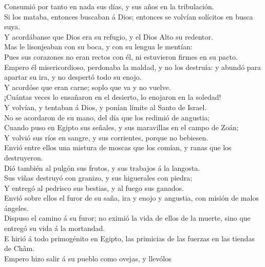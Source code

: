  Consumió por tanto en nada sus días, y sus años en la
tribulación.\\
 Si los mataba, entonces buscaban á Dios; entonces se
volvían solícitos en busca suya.\\
 Y acordábanse que Dios era su refugio, y el Dios Alto su
redentor.\\
 Mas le lisonjeaban con su boca, y con su lengua le
mentían:\\
 Pues sus corazones no eran rectos con él, ni estuvieron
firmes en su pacto.\\
 Empero él misericordioso, perdonaba la maldad, y no los
destruía: y abundó para apartar su ira, y no despertó todo su enojo.\\
 Y acordóse que eran carne; soplo que va y no vuelve.\\
 ¡Cuántas veces lo ensañaron en el desierto, lo enojaron
en la soledad!\\
 Y volvían, y tentaban á Dios, y ponían límite al Santo
de Israel.\\
 No se acordaron de su mano, del día que los redimió de
angustia;\\
 Cuando puso en Egipto sus señales, y sus maravillas en
el campo de Zoán;\\
 Y volvió sus ríos en sangre, y sus corrientes, porque no
bebiesen.\\
 Envió entre ellos una mistura de moscas que los comían,
y ranas que los destruyeron.\\
 Dió también al pulgón sus frutos, y sus trabajos á la
langosta.\\
 Sus viñas destruyó con granizo, y sus higuerales con
piedra;\\
 Y entregó al pedrisco sus bestias, y al fuego sus
ganados.\\
 Envió sobre ellos el furor de su saña, ira y enojo y
angustia, con misión de malos ángeles.\\
 Dispuso el camino á su furor; no eximió la vida de ellos
de la muerte, sino que entregó su vida á la mortandad.\\
 E hirió á todo primogénito en Egipto, las primicias de
las fuerzas en las tiendas de Châm.\\
 Empero hizo salir á su pueblo como ovejas, y llevólos
